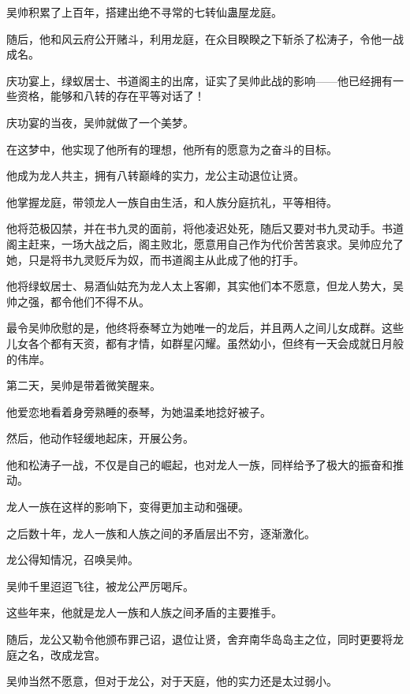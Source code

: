 
\begin{this_body}



吴帅积累了上百年，搭建出绝不寻常的七转仙蛊屋龙庭。

随后，他和风云府公开赌斗，利用龙庭，在众目睽睽之下斩杀了松涛子，令他一战成名。

庆功宴上，绿蚁居士、书道阁主的出席，证实了吴帅此战的影响——他已经拥有一些资格，能够和八转的存在平等对话了！

庆功宴的当夜，吴帅就做了一个美梦。

在这梦中，他实现了他所有的理想，他所有的愿意为之奋斗的目标。

他成为龙人共主，拥有八转巅峰的实力，龙公主动退位让贤。

他掌握龙庭，带领龙人一族自由生活，和人族分庭抗礼，平等相待。

他将范极囚禁，并在书九灵的面前，将他凌迟处死，随后又要对书九灵动手。书道阁主赶来，一场大战之后，阁主败北，愿意用自己作为代价苦苦哀求。吴帅应允了她，只是将书九灵贬斥为奴，而书道阁主从此成了他的打手。

他将绿蚁居士、易酒仙姑充为龙人太上客卿，其实他们本不愿意，但龙人势大，吴帅之强，都令他们不得不从。

最令吴帅欣慰的是，他终将泰琴立为她唯一的龙后，并且两人之间儿女成群。这些儿女各个都有天资，都有才情，如群星闪耀。虽然幼小，但终有一天会成就日月般的伟岸。

第二天，吴帅是带着微笑醒来。

他爱恋地看着身旁熟睡的泰琴，为她温柔地捻好被子。

然后，他动作轻缓地起床，开展公务。

他和松涛子一战，不仅是自己的崛起，也对龙人一族，同样给予了极大的振奋和推动。

龙人一族在这样的影响下，变得更加主动和强硬。

之后数十年，龙人一族和人族之间的矛盾层出不穷，逐渐激化。

龙公得知情况，召唤吴帅。

吴帅千里迢迢飞往，被龙公严厉喝斥。

这些年来，他就是龙人一族和人族之间矛盾的主要推手。

随后，龙公又勒令他颁布罪己诏，退位让贤，舍弃南华岛岛主之位，同时更要将龙庭之名，改成龙宫。

吴帅当然不愿意，但对于龙公，对于天庭，他的实力还是太过弱小。


\end{this_body}
